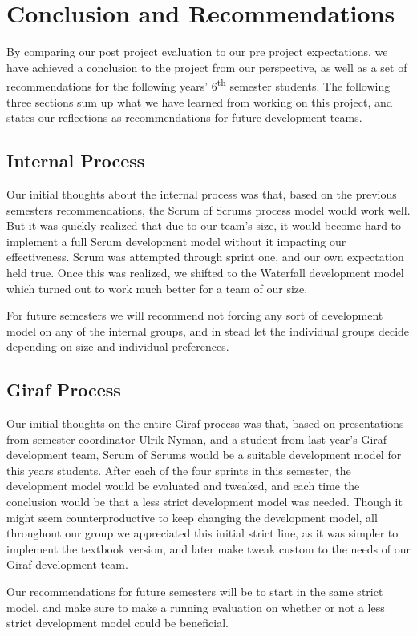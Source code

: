 \chapter{Conclusion and Recommendations}
By comparing our post project evaluation to our pre project expectations, we have achieved a conclusion to the project from our perspective, as well as a set of recommendations for the following years' 6\textsuperscript{th} semester students.
The following three sections sum up what we have learned from working on this project, and states our reflections as recommendations for future development teams.

\section{Internal Process}
Our initial thoughts about the internal process was that, based on the previous semesters recommendations, the Scrum of Scrums process model would work well.
But it was quickly realized that due to our team's size, it would become hard to implement a full Scrum development model without it impacting our effectiveness.
Scrum was attempted through sprint one, and our own expectation held true.
Once this was realized, we shifted to the Waterfall development model which turned out to work much better for a team of our size.

For future semesters we will recommend not forcing any sort of development model on any of the internal groups, and in stead let the individual groups decide depending on size and individual preferences.

\section{Giraf Process}
Our initial thoughts on the entire Giraf process was that, based on presentations from semester coordinator Ulrik Nyman, and a student from last year's Giraf development team, Scrum of Scrums would be a suitable development model for this years students.
After each of the four sprints in this semester, the development model would be evaluated and tweaked, and each time the conclusion would be that a less strict development model was needed.
Though it might seem counterproductive to keep changing the development model, all throughout our group we appreciated this initial strict line, as it was simpler to implement the textbook version, and later make tweak custom to the needs of our Giraf development team.

Our recommendations for future semesters will be to start in the same strict model, and make sure to make a running evaluation on whether or not a less strict development model could be beneficial.

